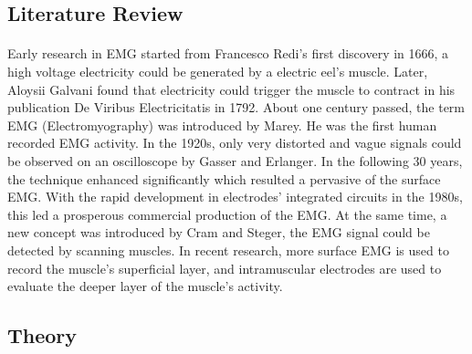 \documentclass[12pt]{article}
\begin{document}
    \subsection{Literature Review}
    \paragraph{}
    Early research in EMG started from  Francesco Redi’s first discovery in 1666, a high voltage electricity could be generated by a electric eel's muscle. Later, Aloysii Galvani found that electricity could trigger the muscle to contract in his publication  De Viribus Electricitatis in 1792\cite{1}. About one century passed, the term EMG (Electromyography) was introduced by Marey. He was the first human recorded EMG activity. In the 1920s, only very distorted and vague signals could be observed on an oscilloscope by Gasser and Erlanger. In the following 30 years, the technique enhanced significantly which resulted a pervasive of the surface EMG. With the rapid development in electrodes' integrated circuits in the 1980s, this led a prosperous commercial production of the EMG. At the same time, a new concept was introduced by Cram and Steger, the EMG signal could be detected by scanning muscles\cite{2}. In recent research, more surface EMG is used to record the muscle's superficial layer, and intramuscular electrodes are used to evaluate the deeper layer of the muscle's activity\cite{3}.  
    
    
    \subsection{Theory}
\end{document}
